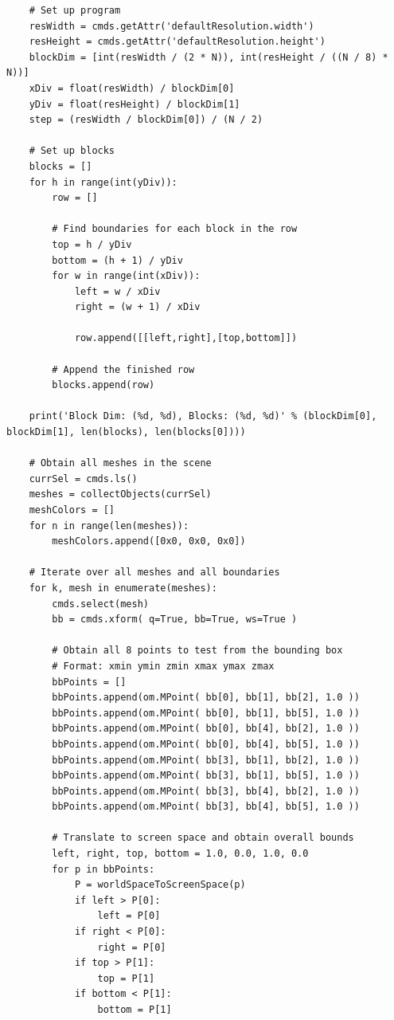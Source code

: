 \documentclass[conference]{IEEEtran}
\begin{document}
{\begin{verbatim}
    # Set up program
    resWidth = cmds.getAttr('defaultResolution.width')
    resHeight = cmds.getAttr('defaultResolution.height')
    blockDim = [int(resWidth / (2 * N)), int(resHeight / ((N / 8) * N))]
    xDiv = float(resWidth) / blockDim[0]
    yDiv = float(resHeight) / blockDim[1]
    step = (resWidth / blockDim[0]) / (N / 2)
        
    # Set up blocks
    blocks = []
    for h in range(int(yDiv)):
        row = []
        
        # Find boundaries for each block in the row
        top = h / yDiv
        bottom = (h + 1) / yDiv
        for w in range(int(xDiv)):
            left = w / xDiv
            right = (w + 1) / xDiv
            
            row.append([[left,right],[top,bottom]])
            
        # Append the finished row
        blocks.append(row)
            
    print('Block Dim: (%d, %d), Blocks: (%d, %d)' % (blockDim[0], blockDim[1], len(blocks), len(blocks[0])))
    
    # Obtain all meshes in the scene
    currSel = cmds.ls()
    meshes = collectObjects(currSel)
    meshColors = []
    for n in range(len(meshes)):
        meshColors.append([0x0, 0x0, 0x0])
    
    # Iterate over all meshes and all boundaries
    for k, mesh in enumerate(meshes):
        cmds.select(mesh)
        bb = cmds.xform( q=True, bb=True, ws=True )
        
        # Obtain all 8 points to test from the bounding box
        # Format: xmin ymin zmin xmax ymax zmax
        bbPoints = []
        bbPoints.append(om.MPoint( bb[0], bb[1], bb[2], 1.0 ))
        bbPoints.append(om.MPoint( bb[0], bb[1], bb[5], 1.0 ))
        bbPoints.append(om.MPoint( bb[0], bb[4], bb[2], 1.0 ))
        bbPoints.append(om.MPoint( bb[0], bb[4], bb[5], 1.0 ))
        bbPoints.append(om.MPoint( bb[3], bb[1], bb[2], 1.0 ))
        bbPoints.append(om.MPoint( bb[3], bb[1], bb[5], 1.0 ))
        bbPoints.append(om.MPoint( bb[3], bb[4], bb[2], 1.0 ))
        bbPoints.append(om.MPoint( bb[3], bb[4], bb[5], 1.0 ))
        
        # Translate to screen space and obtain overall bounds
        left, right, top, bottom = 1.0, 0.0, 1.0, 0.0
        for p in bbPoints:
            P = worldSpaceToScreenSpace(p)
            if left > P[0]:
                left = P[0]
            if right < P[0]:
                right = P[0]
            if top > P[1]:
                top = P[1]
            if bottom < P[1]:
                bottom = P[1]
                    

\end{verbatim}}
\end{document}
